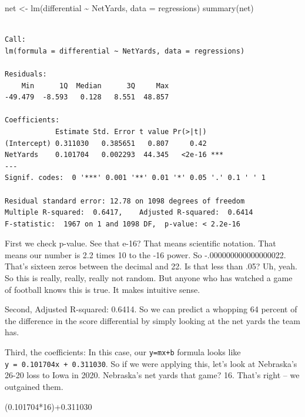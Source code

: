 \documentclass[
  letterpaper,
  DIV=11,
  numbers=noendperiod]{scrreprt}
\newenvironment{Shaded}{\begin{snugshade}}{\end{snugshade}}
\newcommand{\AttributeTok}[1]{\textcolor[rgb]{0.40,0.45,0.13}{#1}}
\newcommand{\DecValTok}[1]{\textcolor[rgb]{0.68,0.00,0.00}{#1}}
\newcommand{\FloatTok}[1]{\textcolor[rgb]{0.68,0.00,0.00}{#1}}
\newcommand{\FunctionTok}[1]{\textcolor[rgb]{0.28,0.35,0.67}{#1}}
\newcommand{\NormalTok}[1]{\textcolor[rgb]{0.00,0.23,0.31}{#1}}
\newcommand{\OtherTok}[1]{\textcolor[rgb]{0.00,0.23,0.31}{#1}}
\newcommand{\SpecialCharTok}[1]{\textcolor[rgb]{0.37,0.37,0.37}{#1}}
\begin{document}
\begin{Shaded}
\begin{Highlighting}[]
\NormalTok{net }\OtherTok{\textless{}{-}} \FunctionTok{lm}\NormalTok{(differential }\SpecialCharTok{\textasciitilde{}}\NormalTok{ NetYards, }\AttributeTok{data =}\NormalTok{ regressions)}
\FunctionTok{summary}\NormalTok{(net)}
\end{Highlighting}
\end{Shaded}

\begin{verbatim}

Call:
lm(formula = differential ~ NetYards, data = regressions)

Residuals:
    Min      1Q  Median      3Q     Max 
-49.479  -8.593   0.128   8.551  48.857 

Coefficients:
            Estimate Std. Error t value Pr(>|t|)    
(Intercept) 0.311030   0.385651   0.807     0.42    
NetYards    0.101704   0.002293  44.345   <2e-16 ***
---
Signif. codes:  0 '***' 0.001 '**' 0.01 '*' 0.05 '.' 0.1 ' ' 1

Residual standard error: 12.78 on 1098 degrees of freedom
Multiple R-squared:  0.6417,    Adjusted R-squared:  0.6414 
F-statistic:  1967 on 1 and 1098 DF,  p-value: < 2.2e-16
\end{verbatim}

First we check p-value. See that e-16? That means scientific notation.
That means our number is 2.2 times 10 to the -16 power. So
-.000000000000000022. That's sixteen zeros between the decimal and 22.
Is that less than .05? Uh, yeah. So this is really, really, really not
random. But anyone who has watched a game of football knows this is
true. It makes intuitive sense.

Second, Adjusted R-squared: 0.6414. So we can predict a whopping 64
percent of the difference in the score differential by simply looking at
the net yards the team has.

Third, the coefficients: In this case, our \texttt{y=mx+b} formula looks
like \texttt{y\ =\ 0.101704x\ +\ 0.311030}. So if we were applying this,
let's look at Nebraska's 26-20 loss to Iowa in 2020. Nebraska's net
yards that game? 16. That's right -- we outgained them.

\begin{Shaded}
\begin{Highlighting}[]
\NormalTok{(}\FloatTok{0.101704}\SpecialCharTok{*}\DecValTok{16}\NormalTok{)}\SpecialCharTok{+}\FloatTok{0.311030} 
\end{Highlighting}
\end{Shaded}
\end{document}
